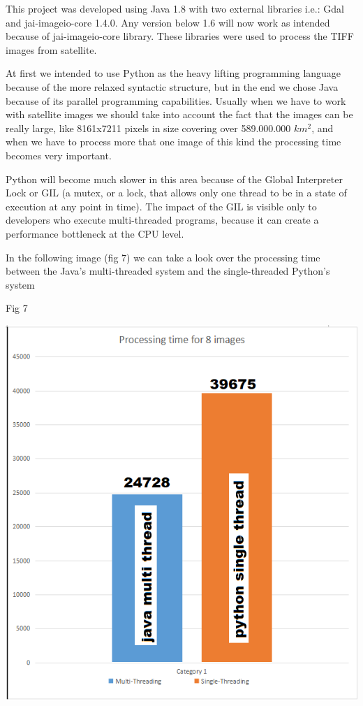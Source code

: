 \documentclass[12pt, a4paper]{report}
\begin{document}
This project was developed using Java 1.8 with two external libraries i.e.: Gdal and jai-imageio-core 1.4.0. Any version below 1.6 will now work as intended because of jai-imageio-core library. These libraries were used to process the TIFF images from satellite.
\par

At first we intended to use Python as the heavy lifting programming language because of the more relaxed syntactic structure, but in the end we chose Java because of its parallel programming capabilities. Usually when we have to work with satellite images we should take into account the fact that the images can be really large, like 8161x7211 pixels in size covering over 589.000.000 $km^2$, and when we have to process more that one image of this kind the processing time becomes very important.
\par

Python will become much slower in this area because of the Global Interpreter Lock or GIL (a mutex, or a lock, that allows only one thread to be in a state of execution at any point in time). The impact of the GIL is visible only to developers who execute multi-threaded programs, because it can create a performance bottleneck at the CPU level.
 \par
 
\bigskip

In the following image (fig 7) we can take a look over the processing time between the Java's multi-threaded system and the single-threaded Python's system
\par

\bigskip

\begin{center}
Fig 7
\end{center}
\par 
\includegraphics[scale=0.7, center]{multi_thread2.png}
\end{document}
